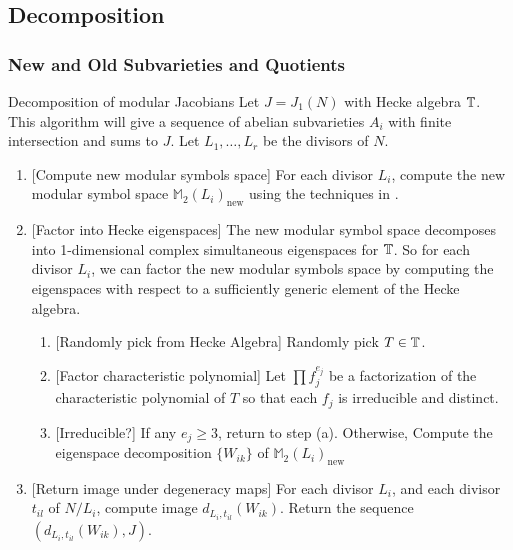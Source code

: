 \documentclass{article}
\begin{document}
\subsection{Decomposition}
\subsubsection{New and Old Subvarieties and Quotients}

\begin{algorithm}{Decomposition of modular Jacobians}
    \label{decomp_jacobian}
    Let $J=J_1(N)$ with Hecke algebra $\mathbb{T}$. This algorithm will give a sequence
    of abelian subvarieties $A_i$ with finite intersection and sums to $J$. Let
    $L_1,\ldots, L_r$ be the divisors of $N$.
    \begin{enumerate}
        \item{} [Compute new modular symbols space]
            For each divisor $L_i$, compute the new modular symbol space
            $\mathbb{M}_2(L_i)_\mathrm{new}$ using the techniques in \cite[\S
            8]{stein:modform}.
        \item{} [Factor into Hecke eigenspaces]
            The new modular symbol space decomposes into 1-dimensional complex
            simultaneous eigenspaces for $\mathbb{T}$. So for each divisor $L_i$, we can
            factor the new modular symbols space by computing the eigenspaces
            with respect to a sufficiently generic element of the Hecke algebra.
            \begin{enumerate}
                \item{} [Randomly pick from Hecke Algebra]
                    Randomly pick $T\in \mathbb{T}$.
                \item{} [Factor characteristic polynomial]
                    Let $\prod f_j ^{e_j}$ be a factorization of the characteristic
                    polynomial of $T$ so that each $f_j$ is irreducible and
                    distinct.
                \item{} [Irreducible?]
                    If any $e_j \geq 3$, return to step (a). Otherwise, Compute
                    the eigenspace decomposition $\{W_{ik}\}$ of
                    $\mathbb{M}_2(L_i)_\mathrm{new}$
            \end{enumerate}
        \item{} [Return image under degeneracy maps]
            For each divisor $L_i$, and each divisor $t_{il}$ of $N/L_i$,
            compute image $d_{L_i, t_{il}}(W_{ik})$. Return the sequence
            $(d_{L_i, t_{il}}(W_{ik}), J)$. 
    \end{enumerate}
\end{algorithm}
\end{document}
